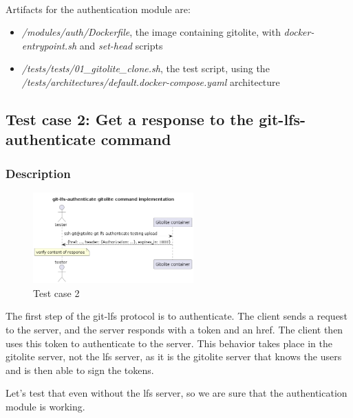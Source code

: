 \paragraph{}
Artifacts for the authentication module are:

\begin{itemize}
    \item \textit{/modules/auth/Dockerfile}, the image containing gitolite, with \textit{docker-entrypoint.sh} and \textit{set-head} scripts
    \item \textit{/tests/tests/01\_gitolite\_clone.sh}, the test script, using the \textit{/tests/architectures/default.docker-compose.yaml} architecture
\end{itemize}

\subsection{Test case 2: Get a response to the git-lfs-authenticate command}

\subsubsection{Description}
\begin{figure}
    \begin{center}
        \includegraphics[width=0.55\textwidth]{iteration_03/diagrams/gitolite_lfs_authenticate}
    \end{center}
    \caption{Test case 2}
\end{figure}


The first step of the git-lfs protocol is to authenticate. The client sends a request to the server, and the server responds with a token and an href. The client then uses this token to authenticate to the server. This behavior takes place in the gitolite server, not the lfs server, as it is the gitolite server that knows the users and is then able to sign the tokens. 

Let's test that even without the lfs server, so we are sure that the authentication module is working.

